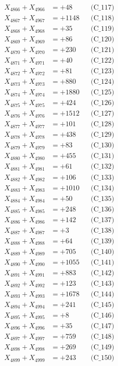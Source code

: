 \documentclass[a4paper,10pt]{article}
\begin{document}
{\begin{align}
X_{4866} + X_{4966} &= +48 && \text{(C\_117)} \\
X_{4867} + X_{4967} &= +1148 && \text{(C\_118)} \\
X_{4868} + X_{4968} &= +35 && \text{(C\_119)} \\
X_{4869} + X_{4969} &= +86 && \text{(C\_120)} \\
\allowbreak
X_{4870} + X_{4970} &= +230 && \text{(C\_121)} \\
X_{4871} + X_{4971} &= +40 && \text{(C\_122)} \\
X_{4872} + X_{4972} &= +81 && \text{(C\_123)} \\
X_{4873} + X_{4973} &= +880 && \text{(C\_124)} \\
X_{4874} + X_{4974} &= +1880 && \text{(C\_125)} \\
\allowbreak
X_{4875} + X_{4975} &= +424 && \text{(C\_126)} \\
X_{4876} + X_{4976} &= +1512 && \text{(C\_127)} \\
X_{4877} + X_{4977} &= +101 && \text{(C\_128)} \\
X_{4878} + X_{4978} &= +438 && \text{(C\_129)} \\
X_{4879} + X_{4979} &= +83 && \text{(C\_130)} \\
\allowbreak
X_{4880} + X_{4980} &= +455 && \text{(C\_131)} \\
X_{4881} + X_{4981} &= +61 && \text{(C\_132)} \\
X_{4882} + X_{4982} &= +106 && \text{(C\_133)} \\
X_{4883} + X_{4983} &= +1010 && \text{(C\_134)} \\
X_{4884} + X_{4984} &= +50 && \text{(C\_135)} \\
\allowbreak
X_{4885} + X_{4985} &= +248 && \text{(C\_136)} \\
X_{4886} + X_{4986} &= +142 && \text{(C\_137)} \\
X_{4887} + X_{4987} &= +3 && \text{(C\_138)} \\
X_{4888} + X_{4988} &= +64 && \text{(C\_139)} \\
X_{4889} + X_{4989} &= +705 && \text{(C\_140)} \\
\allowbreak
X_{4890} + X_{4990} &= +1055 && \text{(C\_141)} \\
X_{4891} + X_{4991} &= +883 && \text{(C\_142)} \\
X_{4892} + X_{4992} &= +123 && \text{(C\_143)} \\
X_{4893} + X_{4993} &= +1678 && \text{(C\_144)} \\
X_{4894} + X_{4994} &= +241 && \text{(C\_145)} \\
\allowbreak
X_{4895} + X_{4995} &= +8 && \text{(C\_146)} \\
X_{4896} + X_{4996} &= +35 && \text{(C\_147)} \\
X_{4897} + X_{4997} &= +759 && \text{(C\_148)} \\
X_{4898} + X_{4998} &= +269 && \text{(C\_149)} \\
X_{4899} + X_{4999} &= +243 && \text{(C\_150)} \\
\end{align}
}
\end{document}
